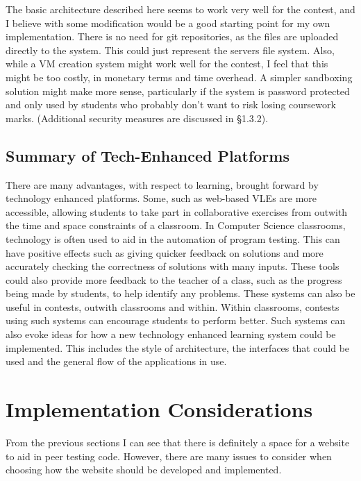 \documentclass[a4paper,11pt]{report}
\begin{document}
The basic architecture described here seems to work very well for the contest, and I believe with some modification would be a good starting point for my own implementation. There is no need for git repositories, as the files are uploaded directly to the system. This could just represent the servers file system. Also, while a VM creation system might work well for the contest, I feel that this might be too costly, in monetary terms and time overhead. A simpler sandboxing solution might make more sense, particularly if the system is password protected and only used by students who probably don't want to risk losing coursework marks. (Additional security measures are discussed in \S 1.3.2).

\subsection{Summary of Tech-Enhanced Platforms}
There are many advantages, with respect to learning, brought forward by technology enhanced platforms. Some, such as web-based VLEs are more accessible, allowing students to take part in collaborative exercises from outwith the time and space constraints of a classroom. In Computer Science classrooms, technology is often used to aid in the automation of program testing. This can have positive effects such as giving quicker feedback on solutions and more accurately checking the correctness of solutions with many inputs. These tools could also provide more feedback to the teacher of a class, such as the progress being made by students, to help identify any problems. These systems can also be useful in contests, outwith classrooms and within. Within classrooms, contests using such systems can encourage students to perform better. Such systems can also evoke ideas for how a new technology enhanced learning system could be implemented. This includes the style of architecture, the interfaces that could be used and the general flow of the applications in use.\par


\section{Implementation Considerations}
From the previous sections I can see that there is definitely a space for a website to aid in peer testing code. However, there are many issues to consider when choosing how the website should be developed and implemented.
\end{document}
